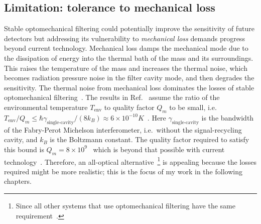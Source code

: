 \subsection{Limitation: tolerance to mechanical loss}
\label{sec:sWLC_loss}

Stable optomechanical filtering could potentially improve the sensitivity of future detectors but addressing its vulnerability to \emph{mechanical loss} demands progress beyond current technology. Mechanical loss damps the mechanical mode due to the dissipation of energy into the thermal bath of the mass and its surroundings. This raises the temperature of the mass and increases the thermal noise, which becomes radiation pressure noise in the filter cavity mode, and then degrades the sensitivity. The thermal noise from mechanical loss dominates the losses of stable optomechanical filtering~\cite{liBroadbandSensitivityImprovement2020}. The results in Ref.~\cite{liBroadbandSensitivityImprovement2020} assume the ratio of the environmental temperature $T_\text{env}$ to quality factor $Q_m$ to be small, i.e.\
$T_\text{env}/Q_m\leq \hbar \gamma_\text{single-cavity}/(8 k_B) \approx 6\times 10^{-10}K$~\cite{miaoEnhancingBandwidthGravitationalWave2015}.
Here $\gamma_\text{single-cavity}$ is the bandwidth of the Fabry-Perot Michelson interferometer, i.e.\ without the signal-recycling cavity, and $k_B$ is the Boltzmann constant.
The quality factor required to satisfy this bound is $Q_m=8\times10^9$~\cite{miaoEnhancingBandwidthGravitationalWave2015} which is beyond that possible with current technology~\cite{masonetal2019,pageEnhancedDetectionHigh2018}. %
Therefore, an all-optical alternative~\footnote{Since all other systems that use optomechanical filtering have the same requirement~\cite{miaoEnhancingBandwidthGravitationalWave2015}.} is appealing because the losses required might be more realistic; this is the focus of my work in the following chapters.


